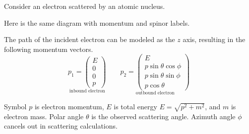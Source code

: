 \documentclass[12pt]{article}
\begin{document}
\noindent
Consider an electron scattered by an atomic nucleus.
\begin{center}
\end{center}

\noindent
Here is the same diagram with momentum and spinor labels.
\begin{center}
\end{center}

\noindent
The path of the incident electron can be modeled as the $z$ axis,
resulting in the following momentum vectors.
\begin{equation*}
\underset{\text{inbound electron}}
{p_1=\begin{pmatrix}E\\0\\0\\p\end{pmatrix}}
\qquad
\underset{\text{outbound electron}}
{
p_2=\begin{pmatrix}
E\\
p\sin\theta\cos\phi\\
p\sin\theta\sin\phi\\
p\cos\theta
\end{pmatrix}
}
\end{equation*}

\noindent
Symbol $p$ is electron momentum,
$E$ is total energy $E=\sqrt{p^2+m^2}$,
and $m$ is electron mass.
Polar angle $\theta$ is the observed scattering angle.
Azimuth angle $\phi$ cancels out in scattering calculations.
\end{document}
